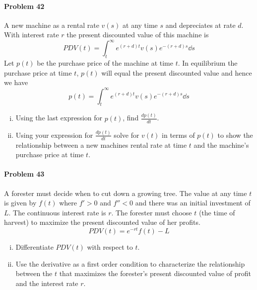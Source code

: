 \documentclass[a4paper, 11pt]{article}
\begin{document}
\paragraph{Problem 42}
A new machine as a rental rate $v(s)$ at any time $s$ and depreciates at rate $d$.
With interest rate $r$ the present discounted value of this machine is 
\[
	PDV(t) = \int_{t}^{\infty} e^{(r+d)t} v(s) e^{-(r+d)s} \dd s
\]
Let $p(t)$ be the purchase price of the machine at time $t$.
In equilibrium the purchase price at time $t$, $p(t)$ will equal the present discounted value and hence we have
\[
	p(t) = \int_{t}^{\infty} e^{(r+d)t} v(s)e^{-(r+d)s} \dd s
\]
\begin{enumerate}[(i)]
	\item Using the last expression for $p(t)$, find $\frac{dp(t)}{dt}$.
	\item Using your expression for $\frac{dp(t)}{dt}$ solve for $v(t)$ in terms of $p(t)$ to show the relationship between a new machines rental rate at time $t$ and the machine's purchase price at time $t$.
\end{enumerate}


\paragraph{Problem 43}
A forester must decide when to cut down a growing tree.
The value at any time $t$ is given by $f(t)$ where $f' > 0$ and $f'' < 0$ and there was an initial investment of $L$.
The continuous interest rate is $r$.
The forester must choose $t$ (the time of harvest) to maximize the present discounted value of her profits.
\[
	PDV(t) = e^{-rt}f(t) - L
\]
\begin{enumerate}[(i)]
	\item Differentiate $PDV(t)$ with respect to $t$.
	\item Use the derivative as a first order condition to characterize the relationship between the $t$ that maximizes the forester's present discounted value of profit and the interest rate $r$.
\end{enumerate}
\end{document}
